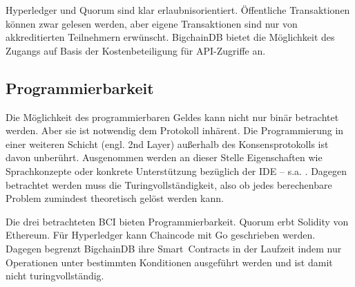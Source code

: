 Hyperledger und Quorum sind klar erlaubnisorientiert.
Öffentliche Transaktionen können zwar gelesen werden, aber eigene Transaktionen sind nur von akkreditierten Teilnehmern erwünscht.
BigchainDB bietet die Möglichkeit des Zugangs auf Basis der Kostenbeteiligung für API-Zugriffe an.

\subsection{Programmierbarkeit}\label{krit:programmierbarkeit}

Die Möglichkeit des programmierbaren Geldes kann nicht nur binär betrachtet werden.
Aber sie ist notwendig dem Protokoll inhärent.
Die Programmierung in einer weiteren Schicht (engl. 2nd Layer) außerhalb des Konsensprotokolls ist davon unberührt.
Ausgenommen werden an dieser Stelle Eigenschaften wie Sprachkonzepte oder konkrete Unterstützung bezüglich der \gls{IDE} -- s.a. .
Dagegen betrachtet werden muss die Turingvollständigkeit, also ob jedes berechenbare Problem zumindest theoretisch gelöst werden kann.  

Die drei betrachteten \gls{BCI} bieten Programmierbarkeit.
Quorum erbt \ua{} Solidity von Ethereum.
Für Hyperledger kann Chaincode \ua{} mit Go geschrieben werden.
Dagegen begrenzt BigchainDB ihre Smart~Contracts in der Laufzeit indem nur Operationen unter bestimmten Konditionen ausgeführt werden und ist damit nicht turingvollständig. 






